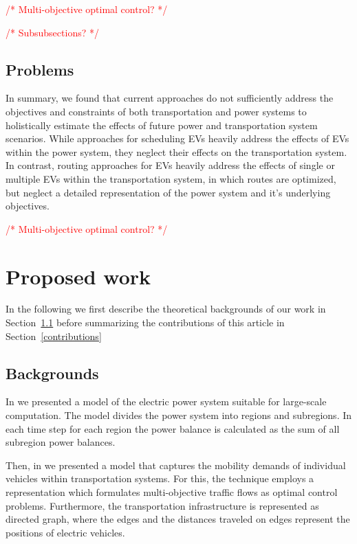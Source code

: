 \documentclass[conference]{IEEEtran}
\newcommand{\todo}[1]{\textcolor{red}{/* #1 */}}
\begin{document}
	\todo{Multi-objective optimal control?}
	
	\todo{Subsubsections?}
	
	\subsection{Problems}
	\label{problems}
	
	In summary, we found that current approaches do not sufficiently address the objectives and constraints of both transportation and power systems to holistically estimate the effects of future power and transportation system scenarios. While approaches for scheduling EVs heavily address the effects of EVs within the power system, they neglect their effects on the transportation system. In contrast, routing approaches for EVs heavily address the effects of single or multiple EVs within the transportation system, in which routes are optimized, but neglect a detailed representation of the power system and it's underlying objectives.
	
	\todo{Multi-objective optimal control?}
	
	\section{Proposed work}
	\label{proposed_work}
	
	In the following we first describe the theoretical backgrounds of our work in Section~\ref{backgrounds} before summarizing the contributions of this article in Section~\ref{contributions}
	
	\subsection{Backgrounds}
	\label{backgrounds}
	
	In \cite{Hackenberg2012} we presented a model of the electric power system suitable for large-scale computation. The model divides the power system into regions and subregions. In each time step for each region the power balance is calculated as the sum of all subregion power balances.
	
	Then, in \cite{ascher2014early} we presented a model that captures the mobility demands of individual vehicles within transportation systems. For this, the technique employs a representation which formulates multi-objective traffic flows as optimal control problems. Furthermore, the transportation infrastructure is represented as directed graph, where the edges and the distances traveled on edges represent the positions of electric vehicles.
	
\end{document}
